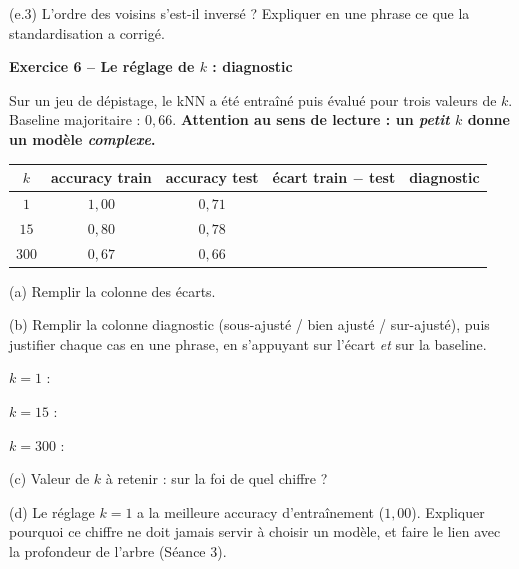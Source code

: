 \documentclass[10pt,a4paper]{article}
\newcommand{\repligne}{\par\vspace{0.42cm}\noindent\dotfill}
\begin{document}
\vspace{0.15cm}
(e.3) L'ordre des voisins s'est-il inversé ? Expliquer en une phrase ce que la standardisation a corrigé.
\repligne
\repligne

\vspace{0.5cm}

\textbf{\large Exercice 6 -- Le réglage de $k$ : diagnostic}

\vspace{0.15cm}

Sur un jeu de dépistage, le kNN a été entraîné puis évalué pour trois valeurs de $k$. Baseline majoritaire : $0{,}66$. \textbf{Attention au sens de lecture : un \emph{petit} $k$ donne un modèle \emph{complexe}.}

\vspace{0.15cm}
{\small
\renewcommand{\arraystretch}{1.9}
\begin{tabular}{|c|c|c|c|c|}
\hline
$k$ & accuracy train & accuracy test & écart train $-$ test & diagnostic\\
\hline
$1$  & $1{,}00$ & $0{,}71$ & & \\
\hline
$15$ & $0{,}80$ & $0{,}78$ & & \\
\hline
$300$ & $0{,}67$ & $0{,}66$ & & \\
\hline
\end{tabular}
}

\vspace{0.2cm}
(a) Remplir la colonne des écarts.

\vspace{0.15cm}
(b) Remplir la colonne diagnostic (sous-ajusté / bien ajusté / sur-ajusté), puis justifier chaque cas en une phrase, en s'appuyant sur l'écart \emph{et} sur la baseline.

\vspace{0.2cm}
$k = 1$ : \dotfill
\repligne

\vspace{0.15cm}
$k = 15$ : \dotfill
\repligne

\vspace{0.15cm}
$k = 300$ : \dotfill
\repligne

\vspace{0.2cm}
(c) Valeur de $k$ à retenir : \makebox[1.5cm]{\dotfill} \quad sur la foi de quel chiffre ? \dotfill

\vspace{0.2cm}
(d) Le réglage $k = 1$ a la meilleure accuracy d'entraînement ($1{,}00$). Expliquer pourquoi ce chiffre ne doit jamais servir à choisir un modèle, et faire le lien avec la profondeur de l'arbre (Séance 3).
\repligne
\repligne
\repligne
\end{document}
